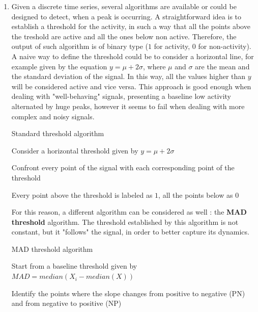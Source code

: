 \documentclass[12pt, a4paper]{report}
\begin{document}
\begin{enumerate}
	
	\item  Given a discrete time series, several algorithms are available or could be designed to detect, when a peak is occurring. A straightforward idea is to establish a threshold for the activity, in such a way that all the points above the treshold are active and all the ones below non active. Therefore, the output of such algorithm is of binary type ($1$ for activity, $0$ for non-activity).\\
	A naive way to define the threshold could be to consider a horizontal line, for example given by the equation $ y = \mu + 2\sigma $,	where $\mu$ and $\sigma$ are the mean and the standard deviation of the signal. In this way, all the values higher than $y$ will be considered active and vice versa. This approach is good enough when dealing with "well-behaving" signals, presenting a baseline low activity alternated by huge peaks, however it seems to fail when dealing with more complex and noisy signals.\\
	\begin{algorithm}
		\caption{Standard threshold algorithm}\label{tresh}
		\begin{algorithmic}[1]
			
			
			\State Consider a horizontal threshold given by $ y = \mu + 2\sigma $
			
			\State Confront every point of the signal with each corresponding point of the threshold
			
			\State Every point above the threshold is labeled as $1$, all the points below as $0$
		\end{algorithmic}
	\end{algorithm}
	
	
	For this reason, a different algorithm can be considered as well \cite{11}: the \textbf{MAD threshold} algorithm. The threshold established by this algorithm is not constant, but it "follows" the signal, in order to better capture its dynamics.\\

	
	
	\begin{algorithm}
		\caption{MAD threshold algorithm}\label{mad}
		\begin{algorithmic}[1]
			
			
			\State Start from a baseline threshold given by $ MAD = median(X_i - median(X))$
			
			\State Identify the points where the slope changes from positive to negative (PN) and from negative to positive (NP)
			

\end{algorithmic}
\end{algorithm}
\end{enumerate}
\end{document}
